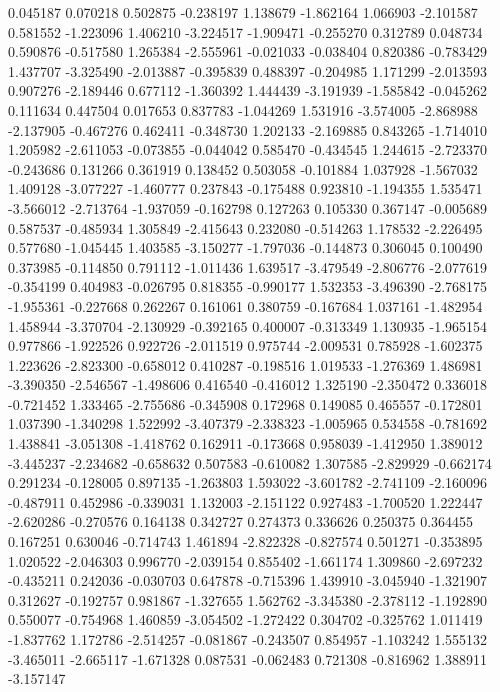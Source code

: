 0.045187
0.070218
0.502875
-0.238197
1.138679
-1.862164
1.066903
-2.101587
0.581552
-1.223096
1.406210
-3.224517
-1.909471
-0.255270
0.312789
0.048734
0.590876
-0.517580
1.265384
-2.555961
-0.021033
-0.038404
0.820386
-0.783429
1.437707
-3.325490
-2.013887
-0.395839
0.488397
-0.204985
1.171299
-2.013593
0.907276
-2.189446
0.677112
-1.360392
1.444439
-3.191939
-1.585842
-0.045262
0.111634
0.447504
0.017653
0.837783
-1.044269
1.531916
-3.574005
-2.868988
-2.137905
-0.467276
0.462411
-0.348730
1.202133
-2.169885
0.843265
-1.714010
1.205982
-2.611053
-0.073855
-0.044042
0.585470
-0.434545
1.244615
-2.723370
-0.243686
0.131266
0.361919
0.138452
0.503058
-0.101884
1.037928
-1.567032
1.409128
-3.077227
-1.460777
0.237843
-0.175488
0.923810
-1.194355
1.535471
-3.566012
-2.713764
-1.937059
-0.162798
0.127263
0.105330
0.367147
-0.005689
0.587537
-0.485934
1.305849
-2.415643
0.232080
-0.514263
1.178532
-2.226495
0.577680
-1.045445
1.403585
-3.150277
-1.797036
-0.144873
0.306045
0.100490
0.373985
-0.114850
0.791112
-1.011436
1.639517
-3.479549
-2.806776
-2.077619
-0.354199
0.404983
-0.026795
0.818355
-0.990177
1.532353
-3.496390
-2.768175
-1.955361
-0.227668
0.262267
0.161061
0.380759
-0.167684
1.037161
-1.482954
1.458944
-3.370704
-2.130929
-0.392165
0.400007
-0.313349
1.130935
-1.965154
0.977866
-1.922526
0.922726
-2.011519
0.975744
-2.009531
0.785928
-1.602375
1.223626
-2.823300
-0.658012
0.410287
-0.198516
1.019533
-1.276369
1.486981
-3.390350
-2.546567
-1.498606
0.416540
-0.416012
1.325190
-2.350472
0.336018
-0.721452
1.333465
-2.755686
-0.345908
0.172968
0.149085
0.465557
-0.172801
1.037390
-1.340298
1.522992
-3.407379
-2.338323
-1.005965
0.534558
-0.781692
1.438841
-3.051308
-1.418762
0.162911
-0.173668
0.958039
-1.412950
1.389012
-3.445237
-2.234682
-0.658632
0.507583
-0.610082
1.307585
-2.829929
-0.662174
0.291234
-0.128005
0.897135
-1.263803
1.593022
-3.601782
-2.741109
-2.160096
-0.487911
0.452986
-0.339031
1.132003
-2.151122
0.927483
-1.700520
1.222447
-2.620286
-0.270576
0.164138
0.342727
0.274373
0.336626
0.250375
0.364455
0.167251
0.630046
-0.714743
1.461894
-2.822328
-0.827574
0.501271
-0.353895
1.020522
-2.046303
0.996770
-2.039154
0.855402
-1.661174
1.309860
-2.697232
-0.435211
0.242036
-0.030703
0.647878
-0.715396
1.439910
-3.045940
-1.321907
0.312627
-0.192757
0.981867
-1.327655
1.562762
-3.345380
-2.378112
-1.192890
0.550077
-0.754968
1.460859
-3.054502
-1.272422
0.304702
-0.325762
1.011419
-1.837762
1.172786
-2.514257
-0.081867
-0.243507
0.854957
-1.103242
1.555132
-3.465011
-2.665117
-1.671328
0.087531
-0.062483
0.721308
-0.816962
1.388911
-3.157147
